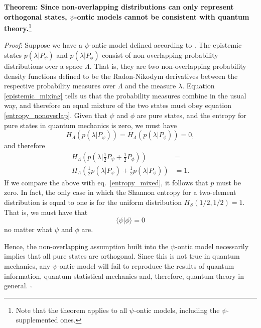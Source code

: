 \documentclass[10pt,twocolumn, nofootinbib]{revtex4-2}
\begin{document}
\textbf{Theorem: Since non-overlapping distributions can only represent orthogonal states, $\psi$-ontic models cannot be consistent with quantum theory.}\footnote{Note that the theorem applies to all $\psi$-ontic models, including the $\psi$-supplemented ones.}

\emph{Proof}: Suppose we have a $\psi$-ontic model defined according to \cite{Harrigan:2010}. The epistemic states $p(\lambda|P_\psi)$ and $p(\lambda|P_\phi)$ consist of non-overlapping probability distributions over a space $\Lambda$. That is, they are two non-overlapping probability density functions defined to be the Radon-Nikodym derivatives between the respective probability measures over $\Lambda$ and the measure $\lambda$. Equation \ref{epistemic_mixing} tells us that the probability measures combine in the usual way, and therefore an equal mixture of the two states must obey equation \ref{entropy_nonoverlap}. Given that $\psi$ and $\phi$ are pure states, and the entropy for pure states in quantum mechanics is zero, we must have
\begin{equation}\label{entropy_pure}
	H_\Lambda(p(\lambda|P_\psi)) = H_\Lambda(p(\lambda|P_\phi)) = 0,
\end{equation}
and therefore
\begin{equation}\label{required_entropy}
	\begin{aligned}
		H_\Lambda\left(p(\lambda|\frac{1}{2}P_\psi + \frac{1}{2}P_\phi)\right) &= \\
		H_\Lambda\left(\frac{1}{2}p(\lambda|P_\psi) + \frac{1}{2}p(\lambda|P_\phi)\right) 
		&= 1.
	\end{aligned}
\end{equation}
If we compare the above with eq.~\ref{entropy_mixed}, it follows that $p$ must be zero. In fact, the only case in which the Shannon entropy for a two-element distribution is equal to one is for the uniform distribution $H_S(1/2, 1/2) = 1$.  That is, we must have that
\begin{equation}\label{orthogonal}
	\langle \psi | \phi \rangle = 0
\end{equation}
no matter what $\psi$ and $\phi$ are.

Hence, the non-overlapping assumption built into the $\psi$-ontic model necessarily implies that all pure states are orthogonal. Since this is not true in quantum mechanics, any $\psi$-ontic model will fail to reproduce the results of quantum information, quantum statistical mechanics and, therefore, quantum theory in general. $\square$
\end{document}
